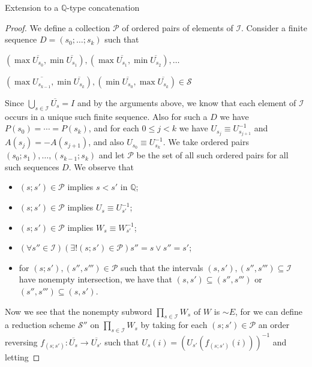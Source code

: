 \documentclass{amsart}
\theoremstyle{definition}\newtheorem{theorem}{Theorem}
\theoremstyle{definition}\newtheorem*{A}{Main Theorem}
\theoremstyle{definition}\newtheorem*{B}{Theorem \ref{elementaryequiv}}
\theoremstyle{definition}\newtheorem*{C}{Theorem \ref{continuous}}
\theoremstyle{definition}\newtheorem*{D}{Theorem \ref{bigisomorphism2}}
\theoremstyle{definition}\newtheorem{bigtheorem}{Main Theorem}
\numberwithin{theorem}{section}
\theoremstyle{definition}\newtheorem{corollary}[theorem]{Corollary}
\theoremstyle{definition}\newtheorem{proposition}[theorem]{Proposition}
\theoremstyle{definition}\newtheorem{definition}[theorem]{Definition}
\theoremstyle{definition}\newtheorem{question}[theorem]{Question}
\theoremstyle{definition}\newtheorem{example}[theorem]{Example}
\theoremstyle{definition}\newtheorem{remark}[theorem]{Remark}
\theoremstyle{definition}\newtheorem{note}[theorem]{Note}
\theoremstyle{definition}\newtheorem{lemma}[theorem]{Lemma}
\theoremstyle{definition}\newtheorem{fact}[theorem]{Fact}
\theoremstyle{definition}\newtheorem{define}[theorem]{Definition}
\theoremstyle{definition}\newtheorem{claim}[theorem]{Claim}
\theoremstyle{definition}\newtheorem{obs}[theorem]{Observation}
\theoremstyle{definition}\newtheorem{definitions}[theorem]{Definitions}
\begin{document}
\begin{section}{Extension to a $\mathbb{Q}$-type concatenation}
\begin{proof}
We define a collection $\mathcal{P}$ of ordered pairs of elements of $\mathcal{I}$.  Consider a finite sequence $D = (s_0; \ldots; s_k)$ such that 

\begin{center}

$(\max\overline{U_{s_0}}, \min\overline{U_{s_1}}), (\max\overline{U_{s_1}}, \min\overline{U_{s_2}}), \ldots$

$(\max\overline{U_{s_{k-1}}}, \min\overline{U_{s_k}}), (\min\overline{U_{s_0}}, \max\overline{U_{s_k}}) \in \mathcal{S}$

\end{center}

\noindent Since $\bigcup_{s \in \mathcal{I}}\overline{U_s} = I$ and by the arguments above, we know that each element of $\mathcal{I}$ occurs in a unique such finite sequence.  Also for such a $D$ we have $P(s_0) = \cdots = P(s_k)$, and for each $0 \leq j < k$ we have $U_{s_j} \equiv U_{s_{j+1}}^{-1}$ and $A(s_j) = -A(s_{j+1})$, and also $U_{s_0} \equiv U_{s_k}^{-1}$.  We take ordered pairs $(s_0; s_1), \ldots, (s_{k-1}; s_k)$ and let $\mathcal{P}$ be the set of all such ordered pairs for all such sequences $D$.  We observe that

\begin{itemize}

\item $(s; s') \in \mathcal{P}$ implies $s < s'$ in $\mathbb{Q}$;

\item $(s; s') \in \mathcal{P}$ implies $U_{s} \equiv U_{s'}^{-1}$;

\item $(s; s') \in \mathcal{P}$ implies $W_s \equiv W_{s'}^{-1}$;

\item $(\forall s'' \in \mathcal{I})(\exists ! (s; s') \in \mathcal{P}) s'' = s \vee s'' = s'$;

\item for $(s; s'), (s'', s''') \in \mathcal{P}$ such that the intervals $(s, s'), (s'', s''') \subseteq \mathcal{I}$ have nonempty intersection, we have that $(s, s') \subseteq (s'', s''')$ or $(s'', s''') \subseteq (s, s')$.


\end{itemize}

Now we see that the nonempty subword $\prod_{s \in \mathcal{I}} W_s$ of $W$ is $\sim E$, for we can define a reduction scheme $\mathcal{S}''$ on $\prod_{s \in \mathcal{I}} W_s$ by taking for each $(s; s') \in \mathcal{P}$ an order reversing $f_{(s; s')}: \overline{U_s} \rightarrow \overline{U_{s'}}$ such that $U_s(i) = (U_{s'}(f_{(s; s')}(i)))^{-1}$ and letting


\end{proof}
\end{section}
\end{document}
